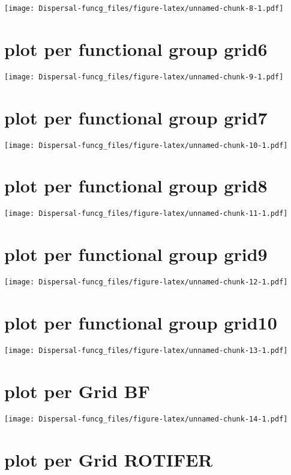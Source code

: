 \documentclass[]{article}
\begin{document}
\texttt{[image: Dispersal-funcg\_files/figure-latex/unnamed-chunk-8-1.pdf]}

\section{plot per functional group
grid6}\label{plot-per-functional-group-grid6}

\texttt{[image: Dispersal-funcg\_files/figure-latex/unnamed-chunk-9-1.pdf]}

\section{plot per functional group
grid7}\label{plot-per-functional-group-grid7}

\texttt{[image: Dispersal-funcg\_files/figure-latex/unnamed-chunk-10-1.pdf]}

\section{plot per functional group
grid8}\label{plot-per-functional-group-grid8}

\texttt{[image: Dispersal-funcg\_files/figure-latex/unnamed-chunk-11-1.pdf]}

\section{plot per functional group
grid9}\label{plot-per-functional-group-grid9}

\texttt{[image: Dispersal-funcg\_files/figure-latex/unnamed-chunk-12-1.pdf]}

\section{plot per functional group
grid10}\label{plot-per-functional-group-grid10}

\texttt{[image: Dispersal-funcg\_files/figure-latex/unnamed-chunk-13-1.pdf]}

\section{plot per Grid BF}\label{plot-per-grid-bf}

\texttt{[image: Dispersal-funcg\_files/figure-latex/unnamed-chunk-14-1.pdf]}

\section{plot per Grid ROTIFER}\label{plot-per-grid-rotifer}
\end{document}

